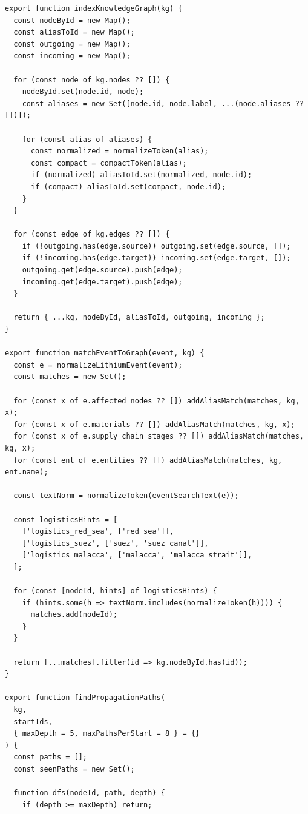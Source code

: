 ﻿\documentclass[12pt,a4paper]{article}
\begin{document}
\begin{lstlisting}[style=projectcode,caption={事件到产业链图谱的匹配与传播路径搜索}]
export function indexKnowledgeGraph(kg) {
  const nodeById = new Map();
  const aliasToId = new Map();
  const outgoing = new Map();
  const incoming = new Map();

  for (const node of kg.nodes ?? []) {
    nodeById.set(node.id, node);
    const aliases = new Set([node.id, node.label, ...(node.aliases ?? [])]);

    for (const alias of aliases) {
      const normalized = normalizeToken(alias);
      const compact = compactToken(alias);
      if (normalized) aliasToId.set(normalized, node.id);
      if (compact) aliasToId.set(compact, node.id);
    }
  }

  for (const edge of kg.edges ?? []) {
    if (!outgoing.has(edge.source)) outgoing.set(edge.source, []);
    if (!incoming.has(edge.target)) incoming.set(edge.target, []);
    outgoing.get(edge.source).push(edge);
    incoming.get(edge.target).push(edge);
  }

  return { ...kg, nodeById, aliasToId, outgoing, incoming };
}

export function matchEventToGraph(event, kg) {
  const e = normalizeLithiumEvent(event);
  const matches = new Set();

  for (const x of e.affected_nodes ?? []) addAliasMatch(matches, kg, x);
  for (const x of e.materials ?? []) addAliasMatch(matches, kg, x);
  for (const x of e.supply_chain_stages ?? []) addAliasMatch(matches, kg, x);
  for (const ent of e.entities ?? []) addAliasMatch(matches, kg, ent.name);

  const textNorm = normalizeToken(eventSearchText(e));

  const logisticsHints = [
    ['logistics_red_sea', ['red sea']],
    ['logistics_suez', ['suez', 'suez canal']],
    ['logistics_malacca', ['malacca', 'malacca strait']],
  ];

  for (const [nodeId, hints] of logisticsHints) {
    if (hints.some(h => textNorm.includes(normalizeToken(h)))) {
      matches.add(nodeId);
    }
  }

  return [...matches].filter(id => kg.nodeById.has(id));
}

export function findPropagationPaths(
  kg,
  startIds,
  { maxDepth = 5, maxPathsPerStart = 8 } = {}
) {
  const paths = [];
  const seenPaths = new Set();

  function dfs(nodeId, path, depth) {
    if (depth >= maxDepth) return;


\end{lstlisting}
\end{document}
